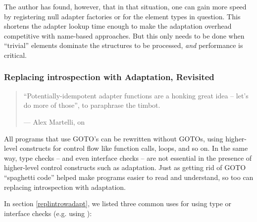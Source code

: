 \begin{verbatim%
}
\begin{verbatim%
}
\begin{verbatim%
}
\begin{verbatim%
}
\begin{verbatim%
}
\begin{verbatim%
}
\begin{verbatim%
}
\begin{verbatim%
}
\begin{verbatim%
}
\begin{verbatim%
}
\begin{verbatim%
}
\begin{verbatim%
}
\begin{verbatim%
}
\begin{verbatim%
}
The author has found, however, that in that situation, one can gain more speed
by registering null adapter factories or  for the
element types in question.  This shortens the adapter lookup time enough to make
the adaptation overhead competitive with name-based approaches.  But this only
needs to be done when ``trivial'' elements dominate the structures to be
processed, \emph{and} performance is critical.

\begin{seealso}

\end{seealso}


\subsubsection{Replacing introspection with Adaptation, Revisited\label{introspect-elim}}

\begin{quotation}
``Potentially-idempotent adapter functions are a honking great
idea -- let's do more of those'', to paraphrase the timbot.

\hfill --- Alex Martelli, on 
\end{quotation}

All programs that use GOTO's can be rewritten without GOTOs, using higher-level
constructs for control flow like function calls,  loops, and so on.
In the same way, type checks -- and even interface checks -- are not essential
in the presence of higher-level control constructs such as adaptation.  Just as
getting rid of GOTO ``spaghetti code'' helped make programs easier to read and
understand, so too can replacing introspection with adaptation.

In section \ref{replintrowadapt}, we listed three common uses for using
type or interface checks (e.g. using ):

\begin{itemize}


\end{itemize}
\end{verbatim%
}
\end{verbatim%
}
\end{verbatim%
}
\end{verbatim%
}
\end{verbatim%
}
\end{verbatim%
}
\end{verbatim%
}
\end{verbatim%
}
\end{verbatim%
}
\end{verbatim%
}
\end{verbatim%
}
\end{verbatim%
}
\end{verbatim%
}
\end{verbatim%
}
